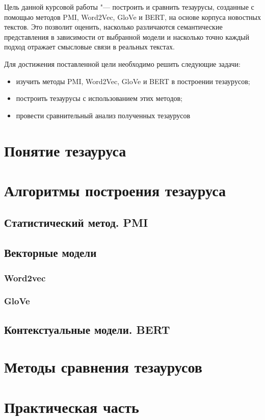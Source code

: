 \documentclass[coursework]{SCWorks}
\begin{document}
Цель данной курсовой работы "--- построить и сравнить тезаурусы, созданные с помощью методов PMI, Word2Vec, GloVe и BERT, на основе корпуса новостных текстов. Это позволит оценить, насколько различаются семантические представления в зависимости от выбранной модели и насколько точно каждый подход отражает смысловые связи в реальных текстах.

Для достижения поставленной цели необходимо решить следующие задачи:
\begin{itemize}
  \item изучить методы PMI, Word2Vec, GloVe и BERT в построении тезаурусов;
  \item построить тезаурусы с использованием этих методов;
  \item провести сравнительный анализ полученных тезаурусов
\end{itemize}

\section{Понятие тезауруса}
\section{Алгоритмы построения тезауруса}
\subsection{Статистический метод. PMI}
\subsection{Векторные модели}
\subsubsection{Word2vec}
\subsubsection{GloVe}
\subsection{Контекстуальные модели. BERT}
\section{Методы сравнения тезаурусов}

\section{Практическая часть}
\end{document}
